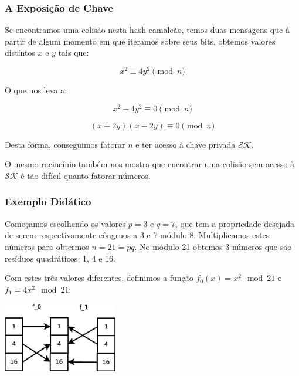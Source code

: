 \documentclass[a4paper]{article}
\begin{document}
\subsubsection{A Exposição de Chave}

Se encontramos uma colisão nesta hash camaleão, temos duas mensagens
que à partir de algum momento em que iteramos sobre seus bits, obtemos
valores distintos $x$ e $y$ tais que:

$$
x^2 \equiv 4y^2 \pmod n
$$

O que nos leva a:

$$
x^2 - 4y^2 \equiv 0 \pmod n
$$

$$
(x+2y)(x-2y) \equiv 0 \pmod n
$$

Desta forma, conseguimos fatorar $n$ e ter acesso à chave privada
$\mathcal{SK}$.

O mesmo raciocínio também nos mostra que encontrar uma colisão sem
acesso à $\mathcal{SK}$ é tão difícil quanto fatorar números.





  

\subsubsection{Exemplo Didático}

Começamos escolhendo os valores $p=3$ e $q=7$, que tem a propriedade
desejada de serem respectivamente côngruos a 3 e 7 módulo
8. Multiplicamos estes números para obtermos $n = 21 = pq$. No módulo
21 obtemos 3 números que são resíduos quadráticos: 1, 4 e 16.

Com estes três valores diferentes, definimos a função $f_0(x)=x^2\mod
21$ e $f_1=4x^2\mod 21$:

\includegraphics[width=5cm]{imagens/toy1.eps}
\end{document}
